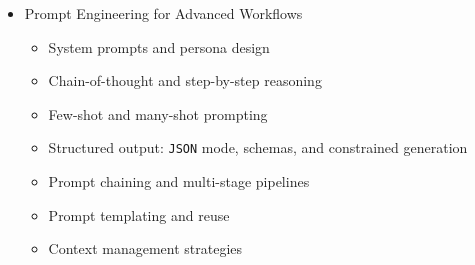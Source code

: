 \documentclass[
]{article}
\providecommand{\tightlist}{%
  \setlength{\itemsep}{0pt}\setlength{\parskip}{0pt}}
\begin{document}
\begin{itemize}
\begin{itemize}
    \begin{itemize}
    \tightlist
    \item
      \texttt{File}-level vs function-level vs chunk-level indexing
    \item
      Handling multiple languages and file types
    \item
      Incremental indexing and keeping indexes fresh
    \item
      Metadata extraction and enrichment
    \end{itemize}
  \item
    \texttt{RAG} for documentation

    \begin{itemize}
    \tightlist
    \item
      Indexing internal wikis, READMEs, design docs
    \item
      Indexing \texttt{API} documentation
    \item
      Indexing Slack/Teams conversations and decision logs
    \end{itemize}
  \item
    Building a \texttt{RAG} pipeline

    \begin{itemize}
    \tightlist
    \item
      Ingestion pipeline design
    \item
      Query construction and rewriting
    \item
      Retrieval and re-ranking
    \item
      Context \texttt{assembly} and prompt construction
    \end{itemize}
  \item
    \texttt{RAG} evaluation and optimization

    \begin{itemize}
    \tightlist
    \item
      Measuring retrieval quality
    \item
      Measuring answer quality
    \item
      Iterating on chunking and embedding strategies
    \end{itemize}
  \end{itemize}
\item
  Prompt Engineering for Advanced Workflows

  \begin{itemize}
  \tightlist
  \item
    System prompts and persona design
  \item
    Chain-of-thought and step-by-step reasoning
  \item
    Few-shot and many-shot prompting
  \item
    Structured output: \texttt{JSON} mode, schemas, and constrained
    generation
  \item
    Prompt chaining and multi-stage pipelines
  \item
    Prompt templating and reuse
  \item
    Context management strategies


\end{itemize}
\end{itemize}
\end{document}
